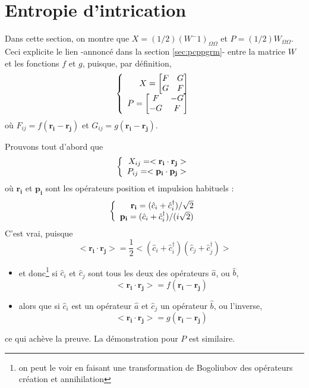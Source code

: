 \documentclass[a4paper, french]{report}
\newcommand{\an}{\hat{a}}
\newcommand{\blbl}{création et annihilation }
\newcommand{\ban}{\hat{b}}
\newcommand{\pos}[1]{\ensuremath{\mathbf{r_{#1}}}\xspace}
\newcommand{\om}{\ensuremath{\Omega}\xspace}
\newcommand{\1}{\ensuremath{\ket{\om_1\bom_1}}\xspace}
\newcommand{\2}{\ensuremath{\ket{\om_2\bom_2}}\xspace}
\newcommand{\can}{\hat{c}}
\newcommand{\ccre}{\hat{c}^\dagger}
\newcommand{\imp}[1]{\ensuremath{\mathbf{p_{#1}}}\xspace}
\begin{document}
\section{Entropie d'intrication}
Dans cette section, on montre que $X=(1/2)(W^-1)_{\om\om}$ et $P=(1/2)W_{\om\om}$. Ceci explicite le lien -annoncé dans la section \ref{sec:pcppgrm}- entre la matrice $W$ et les fonctions $f$ et $g$, puisque, par définition,
\begin{equation}
\left\{
	\begin{array}{r c l}
		X=
		\begin{bmatrix}
		F & G\\
		G & F\\
		\end{bmatrix}\\
		P=
		\begin{bmatrix}
		F & -G\\
		-G & F\\
		\end{bmatrix}
	\end{array}
\right.
\end{equation}
où $F_{ij}=f(\pos{i}-\pos{j})$ et $G_{ij}=g(\pos{i}-\pos{j})$.

Prouvons tout d'abord que 
\begin{equation}
\left\{
	\begin{array}{r c l}
		X_{ij}=<\pos i \cdot \pos j>\\
		P_{ij}=<\imp i\cdot \imp j>
	\end{array}
\right.
\end{equation}
où \pos{i} et \imp{i} sont les opérateurs position et impulsion habituels :
\begin{equation}
\left\{
	\begin{array}{r c l}
		\pos i= (\can_i+\ccre_i)/\sqrt 2\\
		\imp i= (\can_i +\ccre_i)/(i\sqrt 2)
	\end{array}
\right.
\end{equation}
C'est vrai, puisque
\[
	<\pos i \cdot \pos j>=\frac{1}{2}<\left(\can_i+\ccre_i\right)\left(\can_j+\ccre_j\right)>
\]
\begin{itemize}
\item et donc\footnote{on peut le voir en faisant une transformation de Bogoliubov des opérateurs \blbl} si $\can_i$ et $\can_j$ sont tous les deux des opérateurs $\an$, ou $\ban$,
\[
	<\pos i \cdot \pos j>=f(\pos i - \pos j)
\]
\item alors que si $\can_i$ est un opérateur $\an$ et $\can_j$ un opérateur $\ban$, ou l'inverse,
\[
	<\pos i \cdot \pos j>=g(\pos i - \pos j)
\]
\end{itemize}
ce qui achève la preuve.
La démonstration pour $P$ est similaire.
\end{document}
